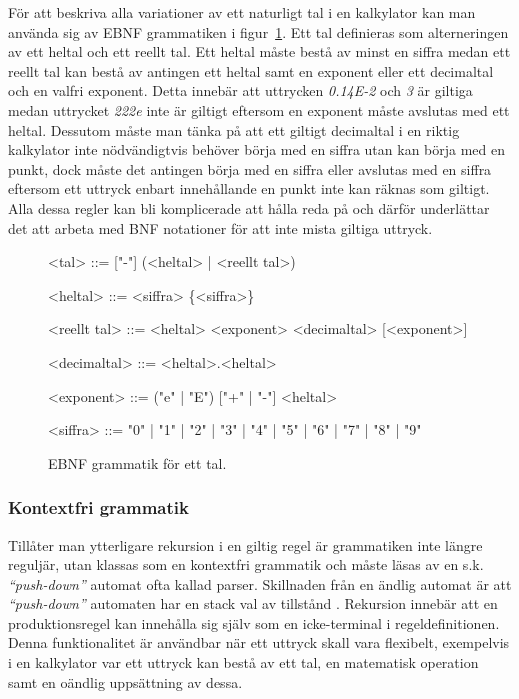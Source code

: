 För att beskriva alla variationer av ett naturligt tal i en kalkylator kan man
använda sig av EBNF grammatiken i figur~\ref{fig:reg}. Ett tal definieras som
alterneringen av ett heltal och ett reellt tal. Ett heltal måste bestå av
minst en siffra medan ett reellt tal kan bestå av antingen ett heltal samt en
exponent eller ett decimaltal och en valfri exponent. Detta innebär att
uttrycken \textit{0.14E-2} och \textit{3} är giltiga medan uttrycket
\textit{222e} inte är giltigt eftersom en exponent måste avslutas med ett
heltal. Dessutom måste man tänka på att ett giltigt decimaltal i en riktig
kalkylator inte nödvändigtvis behöver börja med en siffra utan kan börja med
en punkt, dock måste det antingen börja med en siffra eller avslutas med en
siffra eftersom ett uttryck enbart innehållande en punkt inte kan räknas som
giltigt. Alla dessa regler kan bli komplicerade att hålla reda på och därför
underlättar det att arbeta med BNF notationer för att inte mista giltiga
uttryck.

\begin{figure}[ht]
  \begin{grammar}
    \singlespace\small%
    \selectfont

    <tal> ::= ["-"] (<heltal> | <reellt tal>)

    <heltal> ::= <siffra> \{<siffra>\}

    <reellt tal> ::= <heltal> <exponent>
      \alt <decimaltal> [<exponent>]

    <decimaltal> ::= <heltal>.<heltal>

    <exponent> ::= ("e" | "E") ["+" | "-"] <heltal>

    <siffra> ::= "0" | "1" | "2" | "3" | "4" | "5" | "6" | "7" | "8" | "9"

  \end{grammar}
  \caption{EBNF grammatik för ett tal.}
  \label{fig:reg}
\end{figure}

\subsubsection{Kontextfri grammatik}

Tillåter man ytterligare rekursion i en giltig regel är grammatiken inte
längre reguljär, utan klassas som en kontextfri grammatik och måste läsas av
en s.k. \textit{``push-down''} automat ofta kallad parser. Skillnaden från en
ändlig automat är att \textit{``push-down''} automaten har en stack val av
tillstånd \citep[s.  100]{sm09}. Rekursion innebär att en produktionsregel kan
innehålla sig själv som en icke-terminal i regeldefinitionen. Denna
funktionalitet är användbar när ett uttryck skall vara flexibelt, exempelvis i
en kalkylator var ett uttryck kan bestå av ett tal, en matematisk operation
samt en oändlig uppsättning av dessa.

